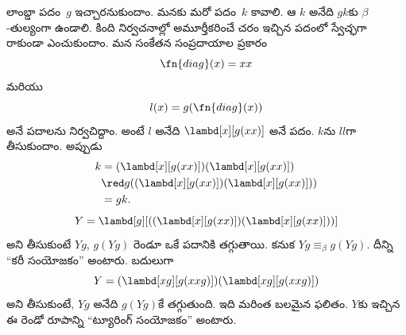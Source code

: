 \documentclass[../../../include/open-logic-section]{subfiles}
\begin{document}

లాంబ్డా పదం~$g$ ఇచ్చారనుకుందాం. మనకు మరో పదం~$k$ కావాలి.
ఆ $k$ అనేది $gk$కు $\beta$-తుల్యంగా ఉండాలి. కింది నిర్వచనాల్లో
అమూర్తీకరించే చరం ఇచ్చిన పదంలో స్వేచ్ఛగా రాకుండా ఎంచుకుందాం.
మన సంకేతన సంప్రదాయాల ప్రకారం
\[
\fn{diag}(x) = xx
\]
మరియు
\[
l(x) = g(\fn{diag}(x))
\]
అనే పదాలను నిర్వచిద్దాం. అంటే $l$ అనేది $\lambd[x][g(xx)]$
అనే పదం. $k$ను $ll$గా తీసుకుందాం. అప్పుడు
\begin{align*}
k & = (\lambd[x][g(xx)])(\lambd[x][g(xx)]) \\
& \red  g((\lambd[x][g(xx)])(\lambd[x][g(xx)])) \\
& = gk.
\end{align*}
\[
Y = \lambd[g][((\lambd[x][g(xx)])(\lambd[x][g(xx)]))]
\]
అని తీసుకుంటే $Yg$, $g(Yg)$ రెండూ ఒకే పదానికి తగ్గుతాయి. కనుక
$Yg \equiv_\beta g(Yg)$. దీన్ని ``కరీ సంయోజకం'' అంటారు. బదులుగా
\[
Y = (\lambd[xg][g(xxg)])(\lambd[xg][g(xxg)])
\]
అని తీసుకుంటే, $Yg$ అనేది $g(Yg)$కే తగ్గుతుంది. ఇది మరింత
బలమైన ఫలితం. $Y$కు ఇచ్చిన ఈ రెండో రూపాన్ని ``ట్యూరింగ్ సంయోజకం'' అంటారు.
\end{document}
